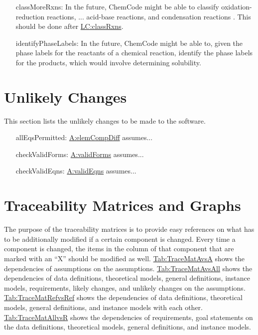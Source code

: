 \documentclass[12pt]{article}
\begin{document}
\begin{itemize}
\item[classMoreRxns:\phantomsection\label{classMoreRxns}]{In the future, ChemCode might be able to classify oxidation-reduction reactions, ... acid-base reactions, and condensation reactions \cite[(pg. 301)]{lund2023}. This should be done after \hyperref[classRxns]{LC:classRxns}.}
\item[identifyPhaseLabels:\phantomsection\label{identifyPhaseLabels}]{In the future, ChemCode might be able to, given the phase labels for the reactants of a chemical reaction, identify the phase labels for the products, which would involve determining solubility.}
\end{itemize}
\section{Unlikely Changes}
\label{Sec:UCs}
This section lists the unlikely changes to be made to the software.

\begin{itemize}
\item[allEqsPermitted:\phantomsection\label{allEqsPermitted}]{\hyperref[elemCompDiff]{A:elemCompDiff} assumes...}
\item[checkValidForms:\phantomsection\label{checkValidForms}]{\hyperref[validForms]{A:validForms} assumes...}
\item[checkValidEqns:\phantomsection\label{checkValidEqns}]{\hyperref[validEqns]{A:validEqns} assumes...}
\end{itemize}
\section{Traceability Matrices and Graphs}
\label{Sec:TraceMatrices}
The purpose of the traceability matrices is to provide easy references on what has to be additionally modified if a certain component is changed. Every time a component is changed, the items in the column of that component that are marked with an ``X'' should be modified as well. \hyperref[Table:TraceMatAvsA]{Tab:TraceMatAvsA} shows the dependencies of assumptions on the assumptions. \hyperref[Table:TraceMatAvsAll]{Tab:TraceMatAvsAll} shows the dependencies of data definitions, theoretical models, general definitions, instance models, requirements, likely changes, and unlikely changes on the assumptions. \hyperref[Table:TraceMatRefvsRef]{Tab:TraceMatRefvsRef} shows the dependencies of data definitions, theoretical models, general definitions, and instance models with each other. \hyperref[Table:TraceMatAllvsR]{Tab:TraceMatAllvsR} shows the dependencies of requirements, goal statements on the data definitions, theoretical models, general definitions, and instance models.
\end{document}
